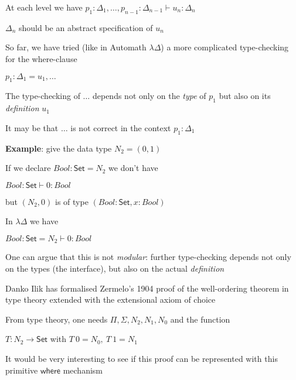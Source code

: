 \documentclass[25pt,dvips,fleqn]{foils}
\newcommand\Set{\mathsf{Set}}
\newcommand\where{\mathsf{where}}
\begin{document}
 At each level we have $p_1:\Delta_1,\dots,p_{n-1}:\Delta_{n-1}\vdash u_{n}:\Delta_{n}$

 $\Delta_n$ should be an abstract specification of $u_n$


 So far, we have tried (like in Automath $\lambda\Delta$) a more complicated
type-checking for the where-clause

 $p_1:\Delta_1=u_1,\dots$

 The type-checking of $\dots$ depends not only on the {\em type}
of $p_1$ but also on its {\em definition} $u_1$

 It may be that $\dots$ is not correct in the context $p_1:\Delta_1$


 {\bf Example}: give the data type $N_2=(0,1)$

 If we declare $Bool:\Set = N_2$ we don't have

 $Bool:\Set\vdash 0:Bool$

but $(N_2,0)$ is of type $(Bool:\Set,x:Bool)$

 In $\lambda\Delta$ we have

 $Bool:\Set=N_2\vdash 0:Bool$

 One can argue that this is not {\em modular}: further type-checking
depends not only on the types (the interface), but also on the actual
{\em definition}


 Danko Ilik has formalised Zermelo's 1904 proof of the well-ordering 
theorem in type theory extended with the extensional axiom of choice

 From type theory, one needs $\Pi,\Sigma,N_2,N_1,N_0$ and the function

 $T:N_2\rightarrow\Set$ with $T~0=N_0,~T~1 = N_1$

 It would be very interesting to see if this proof can be represented
with this primitive $\where$ mechanism
\end{document}
